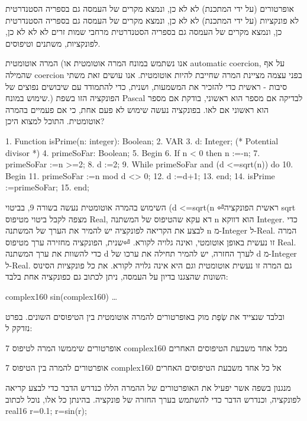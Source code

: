      אופרטורים
      (על ידי המתכנת)
      לא
      לא
      כן, ונמצא מקרים של העמסה גם בספריה הסטנדרטית
      לא
      פונקציות
      (על ידי המתכנת)
      לא
      לא
      כן, ונמצא מקרים של העמסה גם בספריה הסטנדרטית
      כן, ונמצא מקרים של העמסה גם בספריה הסטנדרטית
      מרחבי שמות זרים
      לא
      לא
      לא
      כן, לפונקציות, משתנים וטיפוסים.

      המרה אוטומטית
      (אנו נשתמש במונח המרה אוטומטית או automatic coercion, על אף שהמילה coercion בפני עצמה מציינת המרה שחייבת להיות אוטומטית. אנו עושים זאת משתי סיבות - ראשית כדי להזכיר את המשמעות, ושנית, כדי להתמודד עם שיבושים נפוצים של שימוש במונח.)
      הפונקציה הזו בשפת Pascal לבדיקה אם מספר הוא ראשוני, בודקת אם מספר הוא ראשוני אם לאו. בפונקציה נעשה שימוש לא פעם אחת, כי אם פעמיים בהמרה אוטומטית. התוכל למצוא היכן?

      1. Function isPrime(n: integer): Boolean;
      2. VAR
      3. d: Integer; (* Potential divisor *)
      4. primeSoFar: Boolean;
      5. Begin
      6. If n < 0 then n :=-n;
      7. primeSoFar :=n >=2;
      8. d :=2;
      9. While primeSoFar and (d <=sqrt(n)) do
      10. Begin
      11. primeSoFar :=n mod d <> 0;
      12. d :=d+1;
      13. end;
      14. isPrime :=primeSoFar;
      15. end;

      השימוש בהמרה אוטומטית נעשה בשורה 9, בביטוי
      (d <=sqrt(n
⏎ראשית הפונקציה sqrt מצפה לקבל ביטוי מטיפוס Real, דא עקא שהטיפוס של המשתנה n הוא דווקא Integer. כדי לבצע את הקריאה לפונקציה יש להמיר את הערך של המשתנה n מ-Integer ל-Real. המרה זו נעשית באופן אוטומטי, ואינה גלויה לקורא.
⏎שנית, הפונקציה מחזירה ערך מטיפוס Real. כדי להשוות את ערך המשתנה d לערך החזרה, יש להמיר תחילה את ערכו של d מ-Integer ל-Real. גם המרה זו נעשית אוטומטית וגם היא אינה גלויה לקורא.
      את כל פונקציות הסינוס השונות שהצגנו בדיון על העמסה, ניתן לכתוב גם כפונקציה אחת בלבד:

      complex160 sin(complex160) {…}

      ובלבד שנצייד את שְׂפַת מוק באופרטורים להמרה אוטומטית בין הטיפוסים השונים.
      בפרט נזדקק ל:
      \begin{ציינון}
\item 7 אופרטורים שיממשו המרה לטיפוס complex160 מכל אחד משבעת הטיפוסים האחרים
\item 7 אופרטורים להמרה בין הטיפוס complex160 אל כל אחד משבעת הטיפוסים האחרים
\item מנגנון בשפה אשר יפעיל את האופרטורים של ההמרה הללו כנדרש הדבר כדי לבצע קריאה לפונקציה, וכנדרש הדבר כדי להשתמש בערך החזרה של פונקציה.
      בהינתן כל אלו, נוכל לכתוב
      real16 r=0.1;
      r=sin(r);
  \end{ציינון}

